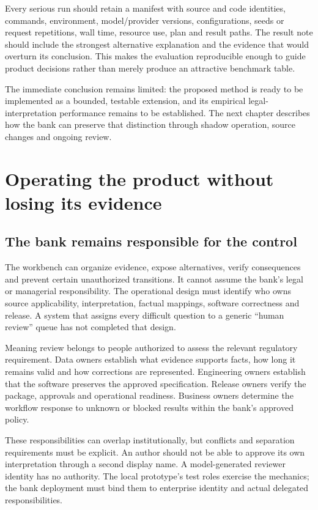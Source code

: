 \documentclass[12pt,a4paper,oneside,openany]{book}
\begin{document}
Every serious run should retain a manifest with source and code identities,
commands, environment, model/provider versions, configurations, seeds or request
repetitions, wall time, resource use, plan and result paths. The result note should
include the strongest alternative explanation and the evidence that would overturn
its conclusion. This makes the evaluation reproducible enough to guide product
decisions rather than merely produce an attractive benchmark table.

The immediate conclusion remains limited: the proposed method is ready to be
implemented as a bounded, testable extension, and its empirical legal-interpretation
performance remains to be established. The next chapter describes how the bank
can preserve that distinction through shadow operation, source changes and
ongoing review.


\chapter{Operating the product without losing its evidence}
\label{ch:operation}

\section{The bank remains responsible for the control}
\label{merge:M10:00}


The workbench can organize evidence, expose alternatives, verify consequences and
prevent certain unauthorized transitions. It cannot assume the bank's legal or
managerial responsibility. The operational design must identify who owns source
applicability, interpretation, factual mappings, software correctness and release.
A system that assigns every difficult question to a generic ``human review'' queue
has not completed that design.

Meaning review belongs to people authorized to assess the relevant regulatory
requirement. Data owners establish what evidence supports facts, how long it
remains valid and how corrections are represented. Engineering owners establish
that the software preserves the approved specification. Release owners verify the
package, approvals and operational readiness. Business owners determine the
workflow response to unknown or blocked results within the bank's approved policy.

These responsibilities can overlap institutionally, but conflicts and separation
requirements must be explicit. An author should not be able to approve its own
interpretation through a second display name. A model-generated reviewer identity
has no authority. The local prototype's test roles exercise the mechanics; the
bank deployment must bind them to enterprise identity and actual delegated
responsibilities.
\end{document}
